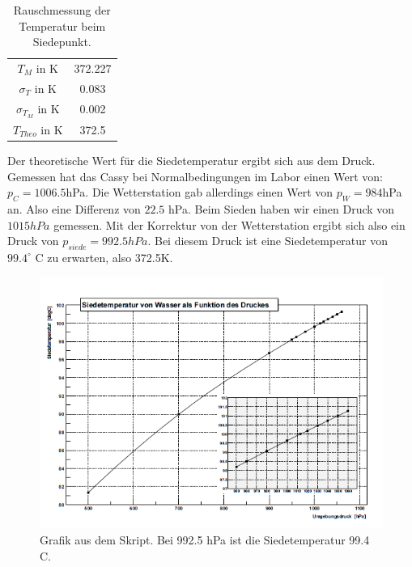 \documentclass[12pt,a4paper]{article}
\begin{document}
\begin{table}[H]\centering
\caption{Rauschmessung der Temperatur beim Siedepunkt.}
\begin{tabular}{c|c}
$T_M$ in K & 372.227  \\
$\sigma_T$ in K & 0.083  \\
$\sigma_{T_M}$ in K & 0.002 \\
$T_{Theo}$ in K & 372.5 \\
\end{tabular} 
\end{table}
Der theoretische Wert für die Siedetemperatur ergibt sich aus dem Druck. Gemessen hat das Cassy bei Normalbedingungen im Labor einen Wert von: $p_C=1006.5$hPa. Die Wetterstation gab allerdings einen Wert von $p_W=984$hPa an. Also eine Differenz von $22.5$ hPa. Beim Sieden haben wir einen Druck von $1015 hPa$ gemessen. Mit der Korrektur von der Wetterstation ergibt sich also ein Druck von $p_{siede}=992.5hPa$. Bei diesem Druck ist eine Siedetemperatur von $99.4^{\circ}$ C zu erwarten, also 372.5K.  
\begin{figure}[H]
\centering
\includegraphics[scale=1]{Bilder/SiedeTemp_Druck.PNG}
\caption{Grafik aus dem Skript. Bei 992.5 hPa ist die Siedetemperatur 99.4 C.}
\end{figure}
\end{document}
